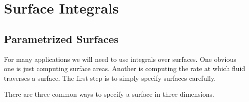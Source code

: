 \graphicspath{{figures/surface_integrals/}}
\chapter{Surface Integrals}\label{chap surface integrals}

\section{Parametrized Surfaces}\label{sec:paramSurfaces}

For many applications we will need to use integrals over surfaces. 
One obvious one is just computing surface areas. Another
is computing the rate at which fluid traverses a surface.
The first step is to simply specify surfaces carefully.

There are three common ways to specify a surface in three dimensions.
